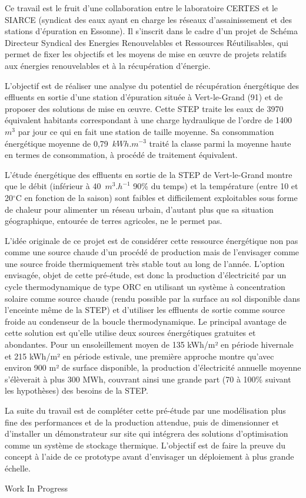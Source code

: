 {\normalsize
Ce travail est le fruit d'une collaboration entre le laboratoire CERTES et le SIARCE (syndicat des eaux ayant en charge les réseaux d'assainissement et des stations d'épuration en Essonne). Il s'inscrit dans le cadre d'un projet de Schéma Directeur Syndical des Energies Renouvelables et Ressources Réutilisables, qui permet de fixer les objectifs et les moyens de mise en œuvre de projets relatifs aux énergies renouvelables et à la récupération d'énergie.



L'objectif est de réaliser une analyse du potentiel de récupération énergétique des effluents en sortie d'une station d'épuration située à Vert-le-Grand (91) et de proposer des solutions de mise en œuvre. Cette STEP traite les eaux de 3970 équivalent habitants correspondant à une charge hydraulique de l'ordre de 1400~$\unit{m^3}$ par jour ce qui en fait une station de taille moyenne. Sa consommation énergétique moyenne de 0,79~$\unit{kWh.m^{-3}}$ traité la classe parmi la moyenne haute en termes de consommation, à procédé de traitement équivalent.



L'étude énergétique des effluents en sortie de la STEP de Vert-le-Grand montre que le débit (inférieur à 40~$\unit{m^3.h^{-1}}$ 90\% du temps) et la température (entre 10 et 20$^{\circ}$C en fonction de la saison) sont faibles et difficilement exploitables sous forme de chaleur pour alimenter un réseau urbain, d'autant plus que sa situation géographique, entourée de terres agricoles, ne le permet pas.



L'idée originale de ce projet est de considérer cette ressource énergétique non pas comme une source chaude d'un procédé de production mais de l'envisager comme une source froide  thermiquement très stable tout au long de l'année. L'option envisagée, objet de cette pré-étude, est donc la production d'électricité par un cycle thermodynamique de type ORC en utilisant un système à concentration solaire comme source chaude (rendu possible par la surface au sol disponible dans l'enceinte même de la STEP) et d'utiliser les effluents de sortie comme source froide au condenseur de la boucle thermodynamique. Le principal avantage de cette solution est qu'elle utilise deux sources énergétiques gratuites et abondantes. Pour un ensoleillement moyen de 135 kWh/m² en période hivernale et 215 kWh/m²  en période estivale, une première approche montre qu'avec environ 900 m² de surface disponible, la production d'électricité annuelle moyenne s'élèverait à plus 300 MWh, couvrant ainsi une grande part (70 à 100\% suivant les hypothèses) des besoins de la STEP.



La suite du travail est de compléter cette pré-étude par une modélisation plus fine des performances et de la production attendue, puis de dimensionner et d'installer un démonstrateur sur site qui intégrera des solutions d'optimisation comme un système de stockage thermique. L'objectif est de faire la preuve du concept à l'aide de ce prototype avant d'envisager un déploiement à plus grande échelle.

 \vfill Work In Progress

}
 
